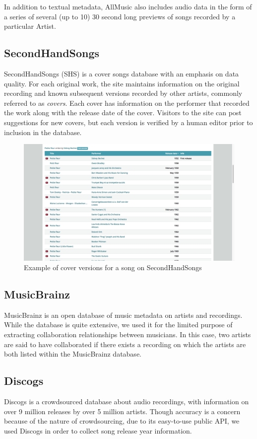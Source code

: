 In addition to textual metadata, AllMusic also includes audio data in the form of a series of several (up to 10) 30 second long previews of songs recorded by a particular Artist. 

\subsection{SecondHandSongs}
SecondHandSongs (SHS) is a cover songs database with an emphasis on data quality. For each original work, the site maintains information on the original recording and known subsequent versions recorded by other artists, commonly referred to as \textit{covers}. Each cover has information on the performer that recorded the work along with the release date of the cover. Visitors to the site can post suggestions for new covers, but each version is verified by a human editor prior to inclusion in the database.

\begin{figure}[H]
\includegraphics[width=\textwidth]{figures/shs_example.png}
\caption{Example of cover versions for a song on SecondHandSongs}
\end{figure}

\subsection{MusicBrainz}
MusicBrainz is an open database of music metadata on artists and recordings. While the database is quite extensive, we used it for the limited purpose of extracting collaboration relationships between musicians. In this case, two artists are said to have collaborated if there exists a recording on which the artists are both listed within the MusicBrainz database.

\subsection{Discogs}
Discogs is a crowdsourced database about audio recordings, with information on over 9 million releases by over 5 million artists. Though accuracy is a concern because of the nature of crowdsourcing, due to its easy-to-use public API, we used Discogs in order to collect song release year information.

